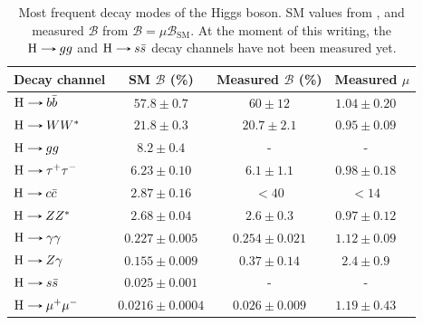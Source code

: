 \begin{table}[!ht]
    \centering
    \begin{tabular}{|l|c|c|cc|}
        \hline
        \multicolumn{1}{|c|}{\cellcolor{lightgray}Decay channel} & \cellcolor{lightgray} SM $\mathcal{B}$ (\%) & \cellcolor{lightgray} Measured $\mathcal{B}$ (\%) & \multicolumn{2}{c|}{\cellcolor{lightgray} Measured $\mu$} \\ \hline
        $\text{H}\decaysto b\bar{b}$     & $57.8 \pm 0.7$        & $60 \pm 12$         & $1.04 \pm 0.20$ & \cite{CMS:2018nsn}  \\
        $\text{H}\decaysto WW^*$         & $21.8 \pm 0.3$        & $20.7 \pm 2.1$      & $0.95 \pm 0.09$ & \cite{CMS:2022uhn}  \\
        $\text{H}\decaysto gg$           & $8.2 \pm 0.4$         & -    & -  &\\
        $\text{H}\decaysto \tau^+\tau^-$ & $6.23 \pm 0.10$       & $6.1 \pm 1.1$       & $0.98 \pm 0.18$ & \cite{CMS:2017zyp}  \\
        $\text{H}\decaysto c\bar{c}$     & $2.87 \pm 0.16$       & $<40$               & $<14$ & \cite{CMS:2022psv}            \\
        $\text{H}\decaysto ZZ^*$         & $2.68 \pm 0.04$       & $2.6 \pm 0.3$       & $0.97 \pm 0.12$ & \cite{CMS:2022dwd}  \\
        $\text{H}\decaysto \gamma\gamma$ & $0.227 \pm 0.005$     & $0.254 \pm 0.021$   & $1.12 \pm 0.09$ & \cite{CMS:2021kom}  \\
        $\text{H}\decaysto Z\gamma$      & $0.155 \pm 0.009$     & $0.37 \pm 0.14$     & $2.4 \pm 0.9$ & \cite{CMS:2022ahq}    \\
        $\text{H}\decaysto s\bar{s}$     & $0.025 \pm 0.001$     & -                   & - &            \\
        $\text{H}\decaysto \mu^+\mu^-$   & $0.0216 \pm 0.0004$   & $0.026 \pm 0.009$   & $1.19 \pm 0.43$ & \cite{CMS:2020xwi}  \\ \hline
    \end{tabular}
    \caption{Most frequent decay modes of the Higgs boson. SM values from \cite{LHCHiggsCrossSectionWorkingGroup:2016ypw, CMS:2022dwd}, and measured $\mathcal{B}$ from $\mathcal{B}=\mu\mathcal{B}_{\text{SM}}$. At the moment of this writing, the $\text{H}\protect\decaysto gg$ and $\text{H}\protect\decaysto s\bar{s}$ decay channels have not been measured yet.}
    \label{tab:Higgs_decays}
\end{table}

